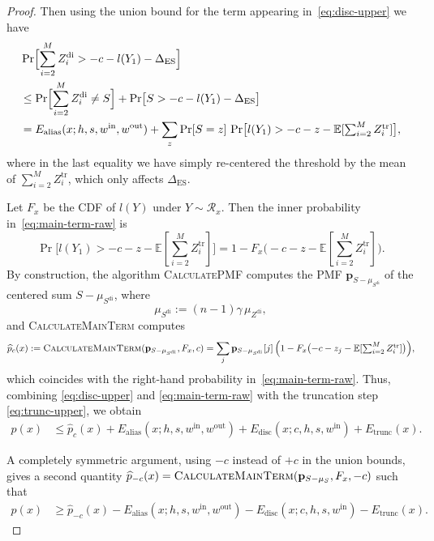 \documentclass{article}
\theoremstyle{plain}
\theoremstyle{definition}
\begin{document}
\begin{proof}
Then using the union bound for the term appearing in~\eqref{eq:disc-upper} we have
\begin{align}
  &\Pr\Bigl[
    \sum_{i=2}^M Z_i^{\mathrm{di}} > -c - l(Y_1) - \Delta_{\mathrm{ES}}
  \Bigr]
  \notag\\
  &\le
  \Pr\Bigl[\sum_{i=2}^M Z_i^{\mathrm{di}} \neq S\Bigr]
  +
  \Pr\bigl[
    S > -c - l(Y_1) - \Delta_{\mathrm{ES}}
  \bigr]
  \notag\\
  &=
  E_{\mathrm{alias}}(x;h,s,w^{\mathrm{in}},w^{\mathrm{out}})
  +
  \sum_z \Pr[S=z]\,
  \Pr\bigl[l(Y_1) > -c - z - \mathbb E[\textstyle\sum_{i=2}^M Z_i^{\mathrm{tr}}]\bigr],
  \label{eq:main-term-raw}
\end{align}
where in the last equality we have simply re-centered the threshold by the mean of
$\sum_{i=2}^M Z_i^{\mathrm{tr}}$, which only affects $\Delta_{\mathrm{ES}}$.

Let $F_x$ be the CDF of $l(Y)$ under $Y\sim\mathcal R_x$.
Then the inner probability in~\eqref{eq:main-term-raw} is
\[
  \Pr\bigl[l(Y_1) > -c - z - \mathbb E[\textstyle\sum_{i=2}^M Z_i^{\mathrm{tr}}]\bigr]
  =
  1 - F_x\bigl(-c - z - \mathbb E[\textstyle\sum_{i=2}^M Z_i^{\mathrm{tr}}]\bigr).
\]
By construction, the algorithm \textsc{CalculatePMF} computes the PMF
$\mathbf p_{S-\mu_{S^\mathrm{di}}}$ of the centered sum $S-\mu_{S^\mathrm{di}}$, where
\[
  \mu_{S^\mathrm{di}} := (n-1)\gamma\,\mu_{Z^{\mathrm{di}}},
\]
and \textsc{CalculateMainTerm} computes
\[
  \widehat p_c(x)
  :=
  \textsc{CalculateMainTerm}(\mathbf p_{S-\mu_{S^\mathrm{di}}},F_x,c)
  =
  \sum_j \mathbf p_{S-\mu_{S^\mathrm{di}}}[j]\,
    \Bigl(1-F_x\bigl(-c-z_j-\mathbb E[\textstyle\sum_{i=2}^M Z_i^{\mathrm{tr}}]\bigr)\Bigr),
\]
which coincides with the right-hand probability in~\eqref{eq:main-term-raw}.
Thus, combining \eqref{eq:disc-upper} and \eqref{eq:main-term-raw} with the truncation step
\eqref{eq:trunc-upper}, we obtain
\begin{align}
  p(x)
  &\le
  \widehat p_c(x)
  + E_{\mathrm{alias}}(x;h,s,w^{\mathrm{in}},w^{\mathrm{out}})
  + E_{\mathrm{disc}}(x;c,h,s,w^{\mathrm{in}})
  + E_{\mathrm{trunc}}(x).
  \label{eq:p-upper-hat}
\end{align}

A completely symmetric argument, using $-c$ instead of $+c$ in the union bounds,
gives a second quantity
$\widehat p_{-c}(x)=\textsc{CalculateMainTerm}(\mathbf p_{S-\mu_S},F_x,-c)$ such that
\begin{align}
  p(x)
  &\ge
  \widehat p_{-c}(x)
  - E_{\mathrm{alias}}(x;h,s,w^{\mathrm{in}},w^{\mathrm{out}})
  - E_{\mathrm{disc}}(x;c,h,s,w^{\mathrm{in}})
  - E_{\mathrm{trunc}}(x).
  \label{eq:p-lower-hat}
\end{align}


\end{proof}
\end{document}
